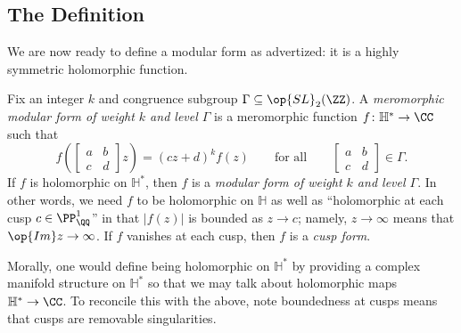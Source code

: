 \documentclass{amsart}
\begin{document}
\subsection{The Definition}
We are now ready to define a modular form as advertized: it is a highly symmetric holomorphic function.
\begin{definition}
	Fix an integer $k$ and congruence subgroup $\Gamma\subseteq\op{SL}_2(\ZZ)$. A \textit{meromorphic modular form of weight $k$ and level $\Gamma$} is a meromorphic function $f\colon\mathbb H^*\to\CC$ such that
	\begin{equation}
		f\left(\begin{bmatrix}
			a & b \\
			c & d
		\end{bmatrix}z\right)=(cz+d)^kf(z)\qquad\text{for all}\qquad\begin{bmatrix}
			a & b \\
			c & d
		\end{bmatrix}\in\Gamma. \label{eq:symmetry-condition}
	\end{equation}
	If $f$ is holomorphic on $\mathbb H^*$, then $f$ is a \textit{modular form of weight $k$ and level $\Gamma$}. In other words, we need $f$ to be holomorphic on $\mathbb H$ as well as ``holomorphic at each cusp $c\in\PP^1_\QQ$'' in that $|f(z)|$ is bounded as $z\to c$; namely, $z\to\infty$ means that $\op{Im}z\to\infty$. If $f$ vanishes at each cusp, then $f$ is a \textit{cusp form}.
\end{definition}
\begin{remark}
	Morally, one would define being holomorphic on $\mathbb H^*$ by providing a complex manifold structure on $\mathbb H^*$ so that we may talk about holomorphic maps $\mathbb H^*\to\CC$. To reconcile this with the above, note boundedness at cusps means that cusps are removable singularities.
\end{remark}
\end{document}
